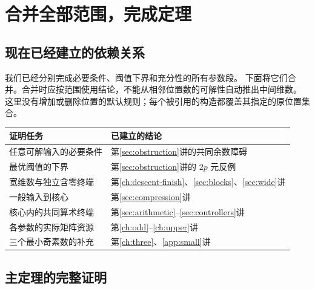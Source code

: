 \chapter{合并全部范围，完成定理}\label{sec:completion}

\section{现在已经建立的依赖关系}
我们已经分别完成必要条件、阈值下界和充分性的所有参数段。
下面将它们合并。合并时应按范围使用结论，不能从相邻位置数的可解性自动推出中间维数。
这里没有增加或删除位置的默认规则；每个被引用的构造都覆盖其指定的原位置集合。

\begin{center}
\begin{tabular}{p{}p{}}
\toprule 证明任务 & 已建立的结论\\\midrule
任意可解输入的必要条件 & 第\ref{sec:obstruction}讲的共同余数障碍\\
最优阈值的下界 & 第\ref{sec:obstruction}讲的 $2p$ 元反例\\
宽维数与独立含零终端 & 第\ref{ch:descent-finish}、\ref{sec:blocks}、\ref{sec:wide}讲\\
一般输入到核心 & 第\ref{sec:compression}讲\\
核心内的共同算术终端 & 第\ref{sec:arithmetic}--\ref{sec:controllers}讲\\
各参数的实际矩阵资源 & 第\ref{ch:odd}--\ref{ch:upper}讲\\
三个最小奇素数的补充 & 第\ref{ch:three}、\ref{app:small}讲\\
\bottomrule
\end{tabular}
\end{center}

\section{主定理的完整证明}

